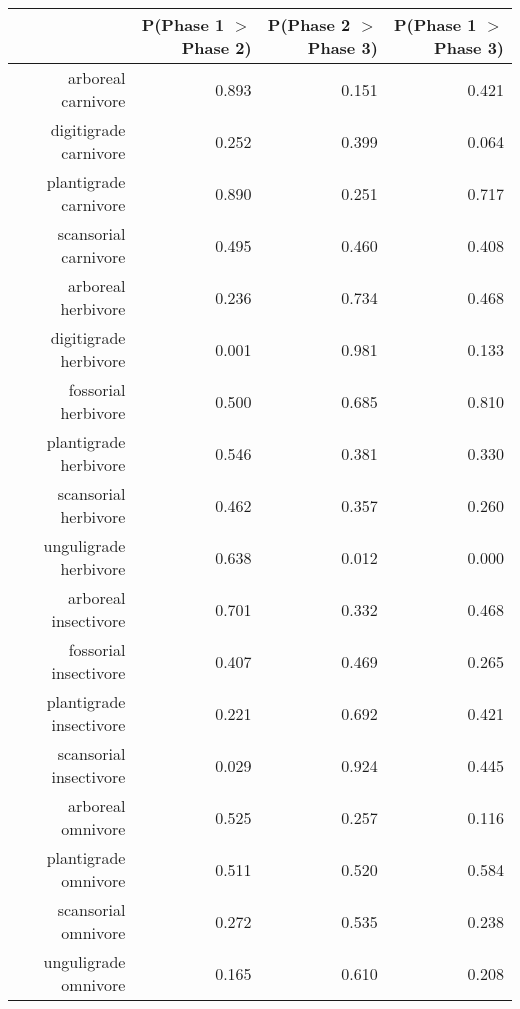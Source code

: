 \begin{table}[ht]
\centering
\begin{tabular}{rrrr}
  \hline
 & P(Phase 1 $>$ Phase 2) & P(Phase 2 $>$ Phase 3) & P(Phase 1 $>$ Phase 3) \\ 
  \hline
arboreal carnivore & 0.893 & 0.151 & 0.421 \\ 
  digitigrade carnivore & 0.252 & 0.399 & 0.064 \\ 
  plantigrade carnivore & 0.890 & 0.251 & 0.717 \\ 
  scansorial carnivore & 0.495 & 0.460 & 0.408 \\ 
  arboreal herbivore & 0.236 & 0.734 & 0.468 \\ 
  digitigrade herbivore & 0.001 & 0.981 & 0.133 \\ 
  fossorial herbivore & 0.500 & 0.685 & 0.810 \\ 
  plantigrade herbivore & 0.546 & 0.381 & 0.330 \\ 
  scansorial herbivore & 0.462 & 0.357 & 0.260 \\ 
  unguligrade herbivore & 0.638 & 0.012 & 0.000 \\ 
  arboreal insectivore & 0.701 & 0.332 & 0.468 \\ 
  fossorial insectivore & 0.407 & 0.469 & 0.265 \\ 
  plantigrade insectivore & 0.221 & 0.692 & 0.421 \\ 
  scansorial insectivore & 0.029 & 0.924 & 0.445 \\ 
  arboreal omnivore & 0.525 & 0.257 & 0.116 \\ 
  plantigrade omnivore & 0.511 & 0.520 & 0.584 \\ 
  scansorial omnivore & 0.272 & 0.535 & 0.238 \\ 
  unguligrade omnivore & 0.165 & 0.610 & 0.208 \\ 
   \hline
\end{tabular}
\label{tab:surv_plant}
\end{table}
